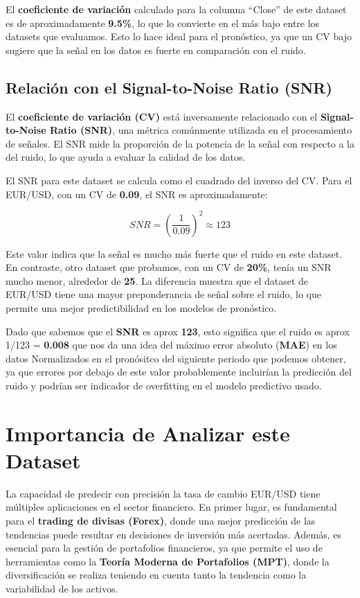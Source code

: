 \documentclass[
]{book}
\begin{document}
El \textbf{coeficiente de variación} calculado para la columna ``Close'' de este dataset es de aproximadamente \textbf{9.5\%}, lo que lo convierte en el más bajo entre los datasets que evaluamos. Esto lo hace ideal para el pronóstico, ya que un CV bajo sugiere que la señal en los datos es fuerte en comparación con el ruido.

\subsection{Relación con el Signal-to-Noise Ratio (SNR)}\label{relaciuxf3n-con-el-signal-to-noise-ratio-snr}

El \textbf{coeficiente de variación (CV)} está inversamente relacionado con el \textbf{Signal-to-Noise Ratio (SNR)}, una métrica comúnmente utilizada en el procesamiento de señales. El SNR mide la proporción de la potencia de la señal con respecto a la del ruido, lo que ayuda a evaluar la calidad de los datos.

El SNR para este dataset se calcula como el cuadrado del inverso del CV. Para el EUR/USD, con un CV de \textbf{0.09}, el SNR es aproximadamente:

\[
SNR = \left(\frac{1}{0.09}\right)^2 \approx 123
\]

Este valor indica que la señal es mucho más fuerte que el ruido en este dataset. En contraste, otro dataset que probamos, con un CV de \textbf{20\%}, tenía un SNR mucho menor, alrededor de \textbf{25}. La diferencia muestra que el dataset de EUR/USD tiene una mayor preponderancia de señal sobre el ruido, lo que permite una mejor predictibilidad en los modelos de pronóstico.

Dado que sabemos que el \textbf{SNR} es aprox \textbf{123}, esto significa que el ruido es aprox 1/123 = \textbf{0.008} que nos da una idea del máximo error absoluto (\textbf{MAE}) en los datos Normalizados en el pronósitco del siguiente periodo que podemos obtener, ya que errores por debajo de este valor probablemente incluirían la predicción del ruido y podrían ser indicador de overfitting en el modelo predictivo usado.

\section{Importancia de Analizar este Dataset}\label{importancia-de-analizar-este-dataset}

La capacidad de predecir con precisión la tasa de cambio EUR/USD tiene múltiples aplicaciones en el sector financiero. En primer lugar, es fundamental para el \textbf{trading de divisas (Forex)}, donde una mejor predicción de las tendencias puede resultar en decisiones de inversión más acertadas. Además, es esencial para la gestión de portafolios financieros, ya que permite el uso de herramientas como la \textbf{Teoría Moderna de Portafolios (MPT)}, donde la diversificación se realiza teniendo en cuenta tanto la tendencia como la variabilidad de los activos.
\end{document}
